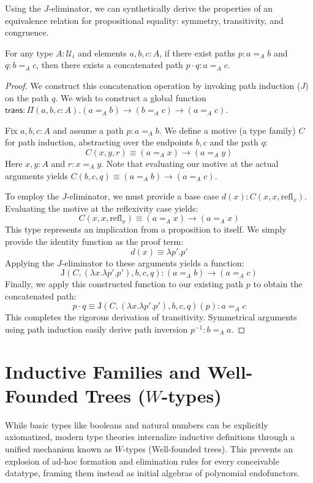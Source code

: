 Using the $J$-eliminator, we can synthetically derive the properties of an equivalence relation for propositional equality: symmetry, transitivity, and congruence.

\begin{lemma}
\label{lem:transitivity}
For any type $A : \mathcal{U}_i$ and elements $a, b, c : A$, if there exist paths $p : a =_A b$ and $q : b =_A c$, then there exists a concatenated path $p \cdot q : a =_A c$.
\end{lemma}

\begin{proof}
We construct this concatenation operation by invoking path induction ($J$) on the path $q$. We wish to construct a global function $\mathsf{trans} : \Pi(a,b,c:A). (a =_A b) \to (b =_A c) \to (a =_A c)$.

Fix $a, b, c : A$ and assume a path $p : a =_A b$. We define a motive (a type family) $C$ for path induction, abstracting over the endpoints $b, c$ and the path $q$:
\[
C(x, y, r) \equiv (a =_A x) \to (a =_A y)
\]
Here $x, y : A$ and $r : x =_A y$. Note that evaluating our motive at the actual arguments yields $C(b, c, q) \equiv (a =_A b) \to (a =_A c)$.

To employ the $J$-eliminator, we must provide a base case $d(x) : C(x, x, \mathrm{refl}_x)$. Evaluating the motive at the reflexivity case yields:
\[
C(x, x, \mathrm{refl}_x) \equiv (a =_A x) \to (a =_A x)
\]
This type represents an implication from a proposition to itself. We simply provide the identity function as the proof term:
\[
d(x) \equiv \lambda p'. p'
\]
Applying the $J$-eliminator to these arguments yields a function:
\[
\mathrm{J}(C, (\lambda x. \lambda p'. p'), b, c, q) : (a =_A b) \to (a =_A c)
\]
Finally, we apply this constructed function to our existing path $p$ to obtain the concatenated path:
\[
p \cdot q \equiv \mathrm{J}(C, (\lambda x. \lambda p'. p'), b, c, q)(p) : a =_A c
\]
This completes the rigorous derivation of transitivity. Symmetrical arguments using path induction easily derive path inversion $p^{-1} : b =_A a$.
\end{proof}

\section{Inductive Families and Well-Founded Trees ($W$-types)}

While basic types like booleans and natural numbers can be explicitly axiomatized, modern type theories internalize inductive definitions through a unified mechanism known as $W$-types (Well-founded trees). This prevents an explosion of ad-hoc formation and elimination rules for every conceivable datatype, framing them instead as initial algebras of polynomial endofunctors.

